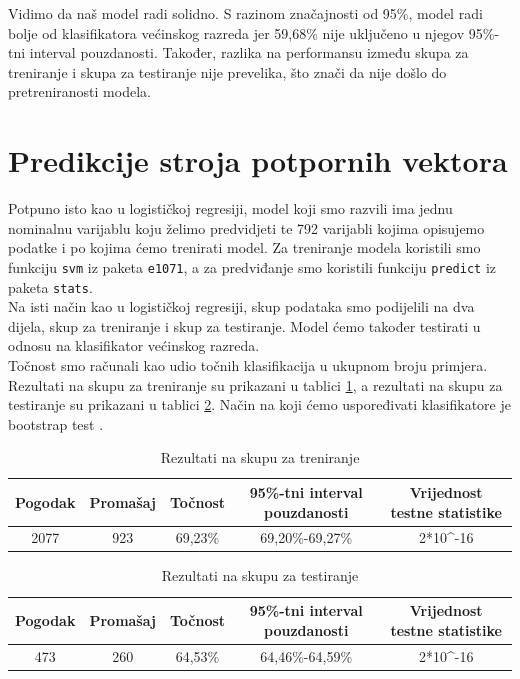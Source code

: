 \documentclass[times,utf8,zavrsni]{fer}
\begin{document}
Vidimo da naš model radi solidno. S razinom značajnosti od 95\%, model radi bolje od klasifikatora većinskog razreda jer 59,68\% nije uključeno u njegov 95\%-tni interval pouzdanosti. Također, razlika na performansu između skupa za treniranje i skupa za testiranje nije prevelika, što znači da nije došlo do pretreniranosti modela. \\

\newpage
\section{Predikcije stroja potpornih vektora}

Potpuno isto kao u logističkoj regresiji, model koji smo razvili ima jednu nominalnu varijablu koju želimo predvidjeti te 792 varijabli kojima opisujemo podatke i po kojima ćemo trenirati model. Za treniranje modela koristili smo funkciju \texttt{svm} iz paketa \texttt{e1071}, a za predviđanje smo koristili funkciju \texttt{predict} iz paketa \texttt{stats}. \\

Na isti način kao u logističkoj regresiji, skup podataka smo podijelili na dva dijela, skup za treniranje i skup za testiranje. Model ćemo također testirati u odnosu na klasifikator većinskog razreda. \\

Točnost smo računali kao udio točnih klasifikacija u ukupnom broju primjera. Rezultati na skupu za treniranje su prikazani u tablici \ref{table:svmTrain}, a rezultati na skupu za testiranje su prikazani u tablici \ref{table:svmTest}. Način na koji ćemo uspoređivati klasifikatore je bootstrap test \citep{bootstrap}.



\begin{table}[h!]
\centering
\small
\caption{Rezultati na skupu za treniranje}
\label{table:svmTrain}
\begin{tabular}{@{}ccccc@{}}
\hline
Pogodak & Promašaj & Točnost  &  95\%-tni interval pouzdanosti & Vrijednost testne statistike \\
\hline
\hline
2077     & 923      & 69,23\% & 69,20\%-69,27\% & 2*10\textasciicircum{}-16 \\
\hline
\end{tabular}
\end{table}



\begin{table}[h!]
\small
\centering
\caption{Rezultati na skupu za testiranje}
\label{table:svmTest}
\begin{tabular}{@{}ccccc@{}}
\hline
Pogodak & Promašaj & Točnost  &  95\%-tni interval pouzdanosti & Vrijednost testne statistike \\
\hline
\hline
473     & 260      & 64,53\% & 64,46\%-64,59\% & 2*10\textasciicircum{}-16 \\
\hline
\end{tabular}
\end{table}
\end{document}
